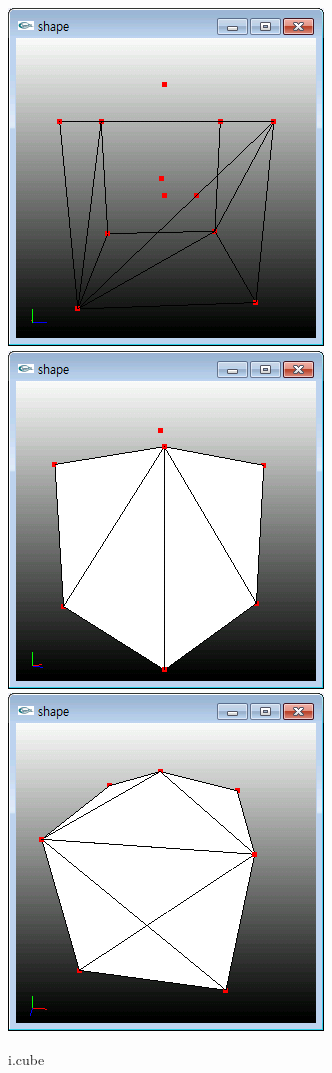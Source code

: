 \documentclass[11pt]{article}
\begin{document}
\begin{figure}[ht]
\centering

\includegraphics[width=.23\textwidth]{FIGS/cube2}
\hspace{0.2cm}
\includegraphics[width=.23\textwidth]{FIGS/cube3}
\hspace{0.2cm}
\includegraphics[width=.23\textwidth]{FIGS/cube4}
\caption{i.cube}
\end{figure}
\end{document}
